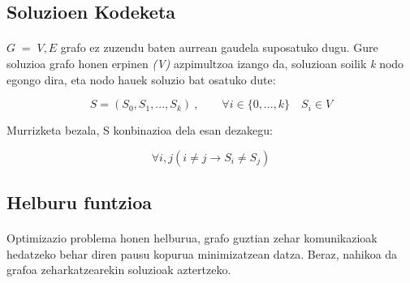 \documentclass[eu,gi]{ifirak}\usepackage[]{graphicx}\usepackage[]{color}
\begin{document}
\subsection{Soluzioen Kodeketa}
\paragraph{}
	$G \;= \;{V,E}$ grafo ez zuzendu baten aurrean gaudela suposatuko dugu. Gure soluzioa grafo honen erpinen \textit{(V)} azpimultzoa izango da, soluzioan soilik \textit{k} nodo egongo dira, eta nodo hauek soluzio bat osatuko dute:

$$S = (S_0, S_1, ... , S_k)\:, \qquad \forall i \in \lbrace 0,...,k \rbrace \quad S_i \in V$$

	Murrizketa bezala, S konbinazioa dela esan dezakegu:

$$\forall i,j( i \neq j \rightarrow S_i \neq S_j )$$

\subsection{Helburu funtzioa}
\paragraph{}

Optimizazio problema honen helburua, grafo guztian zehar komunikazioak hedatzeko behar diren pausu kopurua minimizatzean datza. Beraz, nahikoa da grafoa zeharkatzearekin soluzioak aztertzeko.\\

\end{document}

